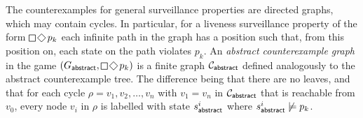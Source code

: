 The counterexamples for general surveillance properties are directed graphs, which may contain cycles. In particular, for a liveness surveillance property of the form $\LTLglobally\LTLfinally p_k$ each infinite path in the graph has a position such that, from this position on, each state on the path violates $p_k$. An \emph{abstract counterexample graph} in the game $(G_\abstr,\LTLglobally\LTLfinally p_k)$ is a finite graph $\mathcal{C}_{\mathsf{abstract}}$ defined analogously to the abstract counterexample tree. The difference being that there are no leaves, and that for each cycle $\rho = v_1,v_2,\ldots,v_n$ with $v_1 = v_n$ in $\mathcal{C}_{\mathsf{abstract}}$ that is reachable from $v_0$, every node $v_i$ in $\rho$ is labelled with state $s_{\mathsf{abstract}}^i$ where $s_{\mathsf{abstract}}^i \not\models p_k$.


